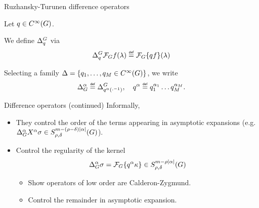 \documentclass{beamer}
\begin{document}
\begin{frame}{Ruzhansky-Turunen difference operators}
    \begin{definition}
        Let $q \in {C^\infty(G)}$.

        We define ${\Delta^{G}_{q}}$ via
        \begin{align*}
            \DifferenceOperator q \Fourier f(\lambda)
            \defeq \Fourier \{q f\}(\lambda)
        \end{align*}
    \end{definition}

    \pause

    Selecting a family $\Delta = \{q_1, \dots, q_M \in {C^\infty(G)}\}$,
    we write
    \begin{align*}
        \DifferenceOperatorOrder \alpha \defeq \DifferenceOperator {q^\alpha(\dummy^{-1})},
        \quad q^\alpha \defeq q^{\alpha_1}_1 \dots q^{\alpha_M}_M.
    \end{align*}
\end{frame}

\begin{frame}{Difference operators (continued)}
    Informally,
    \begin{itemize}
        \item
            They control the order of the terms appearing in asymptotic expansions (e.g. $\DifferenceOperatorOrder \alpha \LeftDifferentialOperator \alpha \sigma \in \SymbolClass {m - (\rho - \delta) \abs \alpha} {\rho, \delta}$).
            \pause
        \item Control the regularity of the kernel
            \begin{align*}
                {\Delta_{G}^{\alpha}} \sigma
                = \mathcal{F}_{G} \{q^\alpha \kappa\}
                \in S^{m - \rho \left|{\alpha}\right|}_{\rho, \delta}(G)
            \end{align*}
            \pause

            \begin{itemize}
                \item
                    Show operators of low order are Calderon-Zygmund.
                    \pause
                \item
                    Control the remainder in asymptotic expansion.
            \end{itemize}
    \end{itemize}
\end{frame}
\end{document}
